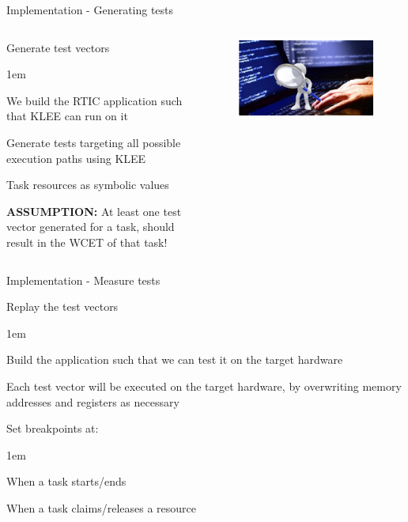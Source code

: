 \begin{frame}{Implementation - Generating tests}
    \begin{columns}
        \begin{block}{Generate test vectors}
            \begin{itemize-size}{1em}
                \item We build the RTIC application such that KLEE can run on it
                \item Generate tests targeting all possible execution paths using KLEE
                \item Task resources as symbolic values
                \item \textbf{ASSUMPTION:} At least one test vector generated for a task, should
                result in the WCET of that task!
            \end{itemize-size}  
        \end{block}

        \begin{figure}
            \centering
            \includegraphics[scale=0.3]{pictures/softwaretesting.jpg}
        \end{figure}
    \end{columns}
\end{frame}

\begin{frame}{Implementation - Measure tests}
    \begin{block}{Replay the test vectors}
        \begin{itemize-size}{1em}
            \item Build the application such that we can test it on the target hardware
            \item Each test vector will be executed on the target hardware, by overwriting
            memory addresses and registers as necessary
            \item Set breakpoints at:
            \begin{itemize-size}{1em}
                \vspace{0.5em}
                \item When a task starts/ends
                \item When a task claims/releases a resource
            \end{itemize-size}
        \end{itemize-size}  
    \end{block}
\end{frame}

